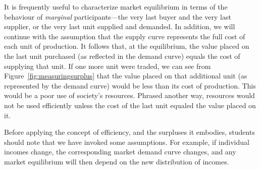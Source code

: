 It is frequently useful to characterize market equilibrium in terms of the behaviour of \textit{marginal} participants---the very last buyer and the very last supplier, or the very last unit supplied and demanded. In addition, we will continue with the assumption that the supply curve represents the full cost of each unit of production. It follows that, at the equilibrium, the value placed on the last unit purchased (as reflected in the demand curve) equals the cost of supplying that unit. If one more unit were traded, we can see from Figure~\ref{fig:measuringsurplus} that the value placed on that additional unit (as represented by the demand curve) would be less than its cost of production. This would be a poor use of society's resources. Phrased another way, resources would not be used efficiently unless the cost of the last unit equaled the value placed on it.

Before applying the concept of efficiency, and the surpluses it embodies, students should note that we have invoked some assumptions. For example, if individual incomes change, the corresponding market demand curve changes, and any market equilibrium will then depend on the new distribution of incomes. 